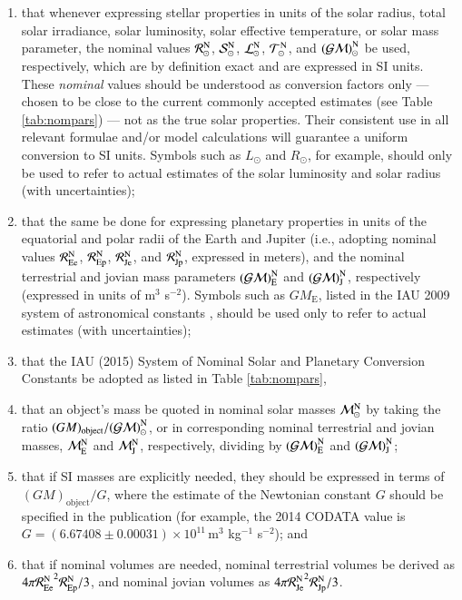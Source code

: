 \documentclass[preprint]{aastex}
\newcommand{\Rnom}{\hbox{$\mathcal{R}^{\mathrm N}_\odot$}}
\newcommand{\Snom}{\hbox{$\mathcal{S}^{\mathrm N}_\odot$}}
\newcommand{\Lnom}{\hbox{$\mathcal{L}^{\mathrm N}_\odot$}}
\newcommand{\Tnom}{\hbox{$\mathcal{T}^{\mathrm N}_\odot$}}
\newcommand{\Mnom}{\hbox{$\mathcal{M}^{\mathrm N}_\odot$}}
\newcommand{\GMnom}{\hbox{$\mathcal{(GM)}^{\mathrm N}_\odot$}}
\newcommand{\REenom}{\hbox{$\mathcal{R}^{\mathrm N}_\mathrm{Ee}$}}
\newcommand{\REpnom}{\hbox{$\mathcal{R}^{\mathrm N}_\mathrm{Ep}$}}
\newcommand{\RJenom}{\hbox{$\mathcal{R}^{\mathrm N}_\mathrm{Je}$}}
\newcommand{\RJpnom}{\hbox{$\mathcal{R}^{\mathrm N}_\mathrm{Jp}$}}
\newcommand{\MEnom}{\hbox{$\mathcal{M}^{\mathrm N}_\mathrm{E}$}}
\newcommand{\MJnom}{\hbox{$\mathcal{M}^{\mathrm N}_\mathrm{J}$}}
\newcommand{\GMEnom}{\hbox{$\mathcal{(GM)}^{\mathrm N}_\mathrm{E}$}}
\newcommand{\GMJnom}{\hbox{$\mathcal{(GM)}^{\mathrm N}_\mathrm{J}$}}
\begin{document}
\begin{enumerate}
\item that whenever expressing stellar properties in units of the solar radius, total solar irradiance, solar luminosity, solar effective temperature, or solar mass parameter, the nominal values $\Rnom$, $\Snom$, $\Lnom$, $\Tnom$, and $\GMnom$ be used, respectively, which are by definition exact and are expressed in SI units. These \emph{nominal} values should be understood as conversion factors only --- chosen to be close to the current commonly accepted estimates (see Table \ref{tab:nompars}) --- not as the true solar properties. Their consistent use in all relevant formulae and/or model calculations will guarantee a uniform conversion to SI units. Symbols such as $L_\odot$ and $R_\odot$, for example, should only be used to refer to actual estimates of the solar luminosity and solar radius (with uncertainties);

\item that the same be done for expressing planetary properties in units of the equatorial and polar radii of the Earth and Jupiter (i.e., adopting nominal values $\REenom$, $\REpnom$, $\RJenom$, and $\RJpnom$, expressed in meters), and the nominal terrestrial and jovian mass parameters $\GMEnom$ and $\GMJnom$, respectively (expressed in units of m${}^3$ s${}^{-2}$). Symbols such as $GM_\mathrm E$, listed in the IAU 2009 system of astronomical constants \citep{luzum2011}, should be used only to refer to actual estimates (with uncertainties);

\item that the IAU (2015) System of Nominal Solar and Planetary Conversion Constants be adopted as listed in Table \ref{tab:nompars},

\item that an object's mass be quoted in nominal solar masses $\Mnom$ by taking the ratio $(GM)_\mathrm{object}/\GMnom$, or in corresponding nominal terrestrial and jovian masses, $\MEnom$ and $\MJnom$, respectively, dividing by $\GMEnom$ and $\GMJnom$;

\item that if SI masses are explicitly needed, they should be expressed in terms of $(GM)_\mathrm{object}/G$, where the estimate of the Newtonian constant $G$ should be specified in the publication (for example, the 2014 CODATA value is $G = (6.67408 \pm 0.00031) \times 10^{11}$\,m${}^3$ kg${}^{-1}$ s${}^{-2}$); and

\item that if nominal volumes are needed, nominal terrestrial volumes be derived as $4\pi \REenom^2 \REpnom / 3$, and nominal jovian volumes as $4\pi \RJenom^2 \RJpnom / 3$.
\end{enumerate}
\end{document}
